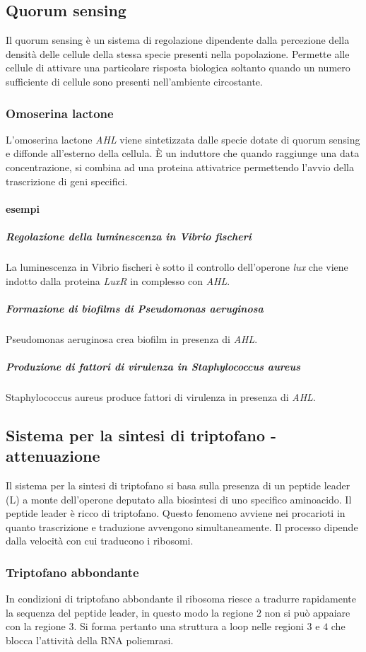 	\subsection{Quorum sensing}
	Il quorum sensing \`e un sistema di regolazione dipendente dalla percezione della densità delle cellule della stessa specie presenti nella popolazione. 
	Permette alle cellule di attivare una particolare risposta biologica soltanto quando un numero sufficiente di cellule sono presenti nell'ambiente circostante.

		\subsubsection{Omoserina lactone}
		L'omoserina lactone \emph{AHL} viene sintetizzata dalle specie dotate di quorum sensing e diffonde all'esterno della cellula.
		\`E un induttore che quando raggiunge una data concentrazione, si combina ad una proteina attivatrice permettendo l'avvio della trascrizione di geni specifici. 

			\paragraph{esempi}

				\subparagraph{Regolazione della luminescenza in Vibrio fischeri}
				La luminescenza in Vibrio fischeri \`e sotto il controllo dell'operone \emph{lux} che viene indotto dalla proteina \emph{LuxR} in complesso con \emph{AHL}.

				\subparagraph{Formazione di biofilms di Pseudomonas aeruginosa}
				Pseudomonas aeruginosa crea biofilm in presenza di \emph{AHL}.

				\subparagraph{Produzione di fattori di virulenza in Staphylococcus aureus}
				Staphylococcus aureus produce fattori di virulenza in presenza di \emph{AHL}.

	\subsection{Sistema per la sintesi di triptofano - attenuazione}
	Il sistema per la sintesi di triptofano si basa sulla presenza di un peptide leader (L) a monte dell'operone deputato alla biosintesi di uno specifico aminoacido. 
	Il peptide leader \`e ricco di triptofano.
	Questo fenomeno avviene nei procarioti in quanto trascrizione e traduzione avvengono simultaneamente.
	Il processo dipende dalla velocit\`a con cui traducono i ribosomi.

		\subsubsection{Triptofano abbondante}
		In condizioni di triptofano abbondante il ribosoma riesce a tradurre rapidamente la sequenza del peptide leader, in questo modo la regione $2$ non si pu\`o appaiare con la regione $3$.
		Si forma pertanto una struttura a loop nelle regioni $3$ e $4$ che blocca l'attivit\`a della RNA poliemrasi.

